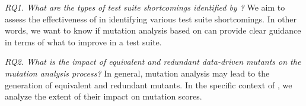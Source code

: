 %    
%
%
%
%
%


\emph{RQ1. What are the types of test suite shortcomings identified by \APPR?}
    We aim to assess the effectiveness of \APPR in identifying various test suite shortcomings.  In other words, we want to know if mutation analysis based on \APPR can provide clear guidance in terms of what to improve in a test suite. 

  



    
\emph{RQ2. 
What is the impact of equivalent and redundant data-driven mutants on the mutation analysis process?}
    In general, mutation analysis may lead to the generation of equivalent and redundant mutants.  
    In the specific context of \APPR, we analyze the extent of their impact on mutation scores.

